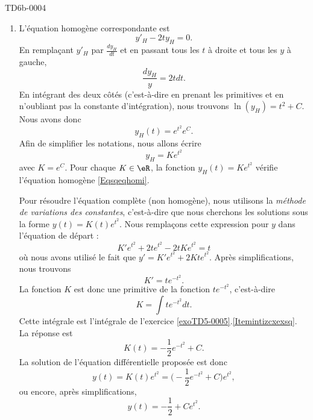 
\begin{corrige}{TD6b-0004}

	\begin{enumerate}
		\item
			L'équation homogène correspondante est
			\begin{equation}		\label{Eqsqeqhomi}
				y'_H-2ty_H=0.
			\end{equation}
			En remplaçant $y'_H$ par $\frac{ dy_H }{ dt }$ et en passant tous les $t$ à droite et tous les $y$ à gauche,
			\begin{equation}
				\frac{ dy_H }{ y }=2tdt.
			\end{equation}
			En intégrant des deux côtés (c'est-à-dire en prenant les primitives et en n'oubliant pas la constante d'intégration), nous trouvons $\ln(y_H)=t^2+C$. Nous avons donc
			\begin{equation}
				y_H(t)= e^{t^2} e^{C}.
			\end{equation}
			Afin de simplifier les notations, nous allons écrire
			\begin{equation}
				y_H= Ke^{t^2}
			\end{equation}
			avec $K= e^{C}$. Pour chaque $K\in \eR$, la fonction $y_H(t)=K e^{t^2}$ vérifie l'équation homogène \eqref{Eqsqeqhomi}.

			Pour résoudre l'équation complète (non homogène), nous utilisons la \emph{méthode de variations des constantes}, c'est-à-dire que nous cherchons les solutions sous la forme $y(t)=K(t) e^{t^2}$. Nous remplaçons cette expression pour $y$ dans l'équation de départ :
			\begin{equation}
				K' e^{t^2}+2t e^{t^2}-2tK e^{t^2}=t
			\end{equation}
			où nous avons utilisé le fait que $y'=K' e^{t^2}+2Kt e^{t^2}$. Après simplifications, nous trouvons
			\begin{equation}
				K'=t e^{-t^2}.
			\end{equation}
			La fonction $K$ est donc une primitive de la fonction $t e^{-t^2}$, c'est-à-dire
			\begin{equation}
				K=\int t e^{-t^2}dt.
			\end{equation}
			Cette intégrale est l'intégrale de l'exercice \ref{exoTD5-0005}.\ref{Itemintizcxexsq}. La réponse est
			\begin{equation}
				K(t)=-\frac{ 1 }{2} e^{-t^2}+C.
			\end{equation}
			La solution de l'équation différentielle proposée est donc
			\begin{equation}
				y(t)=K(t) e^{t^2}=\big( -\frac{ 1 }{2} e^{-t^2}+C \big) e^{t^2},
			\end{equation}
			ou encore, après simplifications, 
			\begin{equation}
				y(t)=-\frac{ 1 }{2}+C e^{t^2}.
			\end{equation}
			

\end{enumerate}
\end{corrige}
